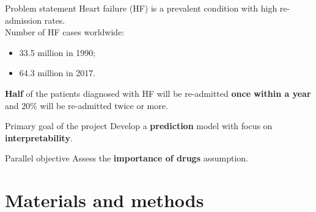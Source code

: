 \documentclass[aspectratio=169,xcolor=dvipsnames,handout]{beamer}
\begin{document}
\begin{frame}{Problem statement}
    Heart failure (HF) is a prevalent condition with high re-admission rates.\\
    Number of HF cases worldwide:
    \begin{itemize}
        \item 33.5 million in 1990;
        \item 64.3 million in 2017.
    \end{itemize}
    
    \textbf{Half} of the patients diagnosed with HF will be re-admitted \textbf{once within a year} and 20\% will be re-admitted twice or more.
    \pause
    \begin{block}{Primary goal of the project}
        Develop a \textbf{prediction} model with focus on \textbf{interpretability}.
    \end{block}

    \begin{block}{Parallel objective}
        Assess the \textbf{importance of drugs} assumption.
    \end{block}

\end{frame}



\section{Materials and methods}

\end{document}
